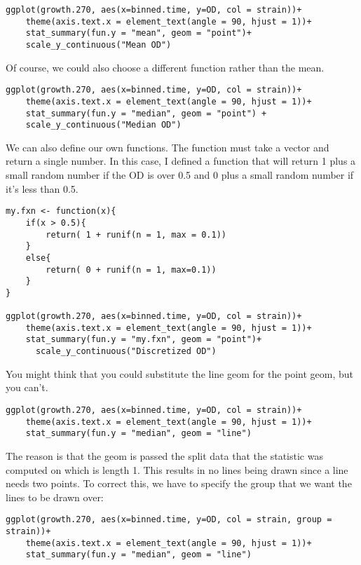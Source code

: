 \documentclass[11pt]{article}
\begin{document}
\begin{verbatim}
ggplot(growth.270, aes(x=binned.time, y=OD, col = strain))+
    theme(axis.text.x = element_text(angle = 90, hjust = 1))+
    stat_summary(fun.y = "mean", geom = "point")+
    scale_y_continuous("Mean OD")
\end{verbatim}


Of course, we could also choose a different function rather than the mean.

\begin{verbatim}
ggplot(growth.270, aes(x=binned.time, y=OD, col = strain))+
    theme(axis.text.x = element_text(angle = 90, hjust = 1))+
    stat_summary(fun.y = "median", geom = "point") +
    scale_y_continuous("Median OD")
\end{verbatim}


We can also define our own functions. The function must take a vector and return
a single number. In this case, I defined a function that will return 1
plus a small random number if the OD is over 0.5 and 0 plus a small
random number if it's less than 0.5. 

\begin{verbatim}
my.fxn <- function(x){
    if(x > 0.5){
        return( 1 + runif(n = 1, max = 0.1))
    }
    else{
        return( 0 + runif(n = 1, max=0.1))
    }
}

ggplot(growth.270, aes(x=binned.time, y=OD, col = strain))+
    theme(axis.text.x = element_text(angle = 90, hjust = 1))+
    stat_summary(fun.y = "my.fxn", geom = "point")+
      scale_y_continuous("Discretized OD")
\end{verbatim}


You might think that you could substitute the line geom for the point
geom, but you can't.

\begin{verbatim}
ggplot(growth.270, aes(x=binned.time, y=OD, col = strain))+
    theme(axis.text.x = element_text(angle = 90, hjust = 1))+
    stat_summary(fun.y = "median", geom = "line")
\end{verbatim}


The reason is that the geom is passed the split data that the statistic was computed on which
is length 1. This results in no lines being drawn since a line needs
two points. To correct this, we have to specify the group that we want
the lines to be drawn over:

\begin{verbatim}
ggplot(growth.270, aes(x=binned.time, y=OD, col = strain, group = strain))+
    theme(axis.text.x = element_text(angle = 90, hjust = 1))+
    stat_summary(fun.y = "median", geom = "line")
\end{verbatim}
\end{document}
